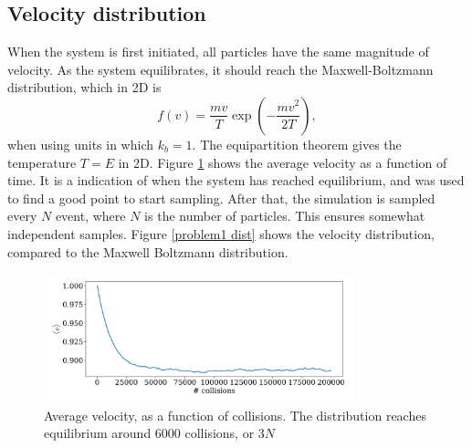 \documentclass{article}
\begin{document}
        \subsection*{Velocity distribution}
            When the system is first initiated, all particles have the same magnitude of velocity. As the system equilibrates, it should reach the Maxwell-Boltzmann distribution, which in 2D is
            \begin{equation*}
                f(v) = \frac{m v}{T} \exp \left(-\frac{m v^2}{2 T}\right),
            \end{equation*}
            when using units in which $k_b = 1$. The equipartition theorem gives the temperature $T = E$ in 2D. Figure \ref{problem1 av vel} shows the average velocity as a function of time. It is a indication of when the system has reached equilibrium, and was used to find a good point to start sampling. After that, the simulation is sampled every $N$ event, where $N$ is the number of particles. This ensures somewhat independent samples. Figure \ref{problem1 dist} shows the velocity distribution, compared to the Maxwell Boltzmann distribution. 
            \begin{figure}[h]
                \centering
                \includegraphics[width=0.8\textwidth]{../plots/problem1/v_av.pdf}
                \caption{Average velocity, as a function of collisions. The distribution reaches equilibrium around $6000$ collisions, or $3N$}
                \label{problem1 av vel}
            \end{figure}
\end{document}
